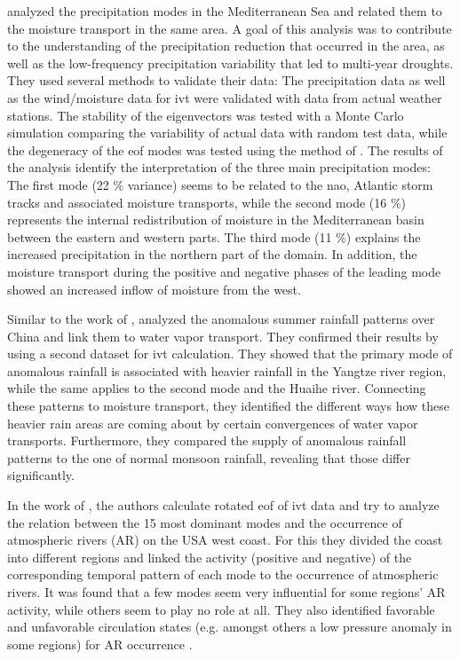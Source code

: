 


\citeauthor{fernandez_analysis_2003} analyzed the precipitation modes in the Mediterranean Sea and related them to the moisture transport in the same area. 
A goal of this analysis was to contribute to the understanding of the precipitation reduction that occurred in the area, as well as the low-frequency precipitation variability that led to multi-year droughts.
They used several methods to validate their data: The precipitation data as well as the wind/moisture data for \ac{ivt} were validated with data from actual weather stations. 
The stability of the eigenvectors was tested with a Monte Carlo simulation comparing the variability of actual data with random test data, while the degeneracy of the \ac{eof} modes was tested using the method of . 
The results of the analysis identify the interpretation of the three main precipitation modes:
The first mode (22 \% variance) seems to be related to the \ac{nao}, Atlantic storm tracks and associated moisture transports, while the second mode (16 \%) represents the internal redistribution of moisture in the Mediterranean basin between the eastern and western parts.  
The third mode (11 \%) explains the increased precipitation in the northern part of the domain. 
In addition, the moisture transport during the positive and negative phases of the leading mode showed an increased inflow of moisture from the west. \cite{fernandez_analysis_2003} 



Similar to the work of , \citeauthor{zhou_atmospheric_2005} analyzed the anomalous summer rainfall patterns over China and link them to water vapor transport. 
They confirmed their results by using a second dataset for \ac{ivt} calculation. 
They showed that the primary mode of anomalous rainfall is associated with heavier rainfall in the Yangtze river region, while the same applies to the second mode and the Huaihe river. 
Connecting these patterns to moisture transport, they identified the different ways how these heavier rain areas are coming about by certain convergences of water vapor transports. 
Furthermore, they compared the supply of anomalous rainfall patterns to the one of normal monsoon rainfall, revealing that those differ significantly. \cite{zhou_atmospheric_2005}


In the work of , the authors calculate rotated \ac{eof} of \ac{ivt} data and try to analyze the relation between the 15 most dominant modes and the occurrence of atmospheric rivers (AR) on the USA west coast. 
For this they divided the coast into different regions and linked the activity (positive and negative) of the corresponding temporal pattern of each mode to the occurrence of atmospheric rivers. 
It was found that a few modes seem very influential for some regions' AR activity, while others seem to play no role at all. 
They also identified favorable and unfavorable circulation states (e.g. amongst others a low pressure anomaly in some regions) for AR occurrence \cite{guirguis_circulation_2018}. 


